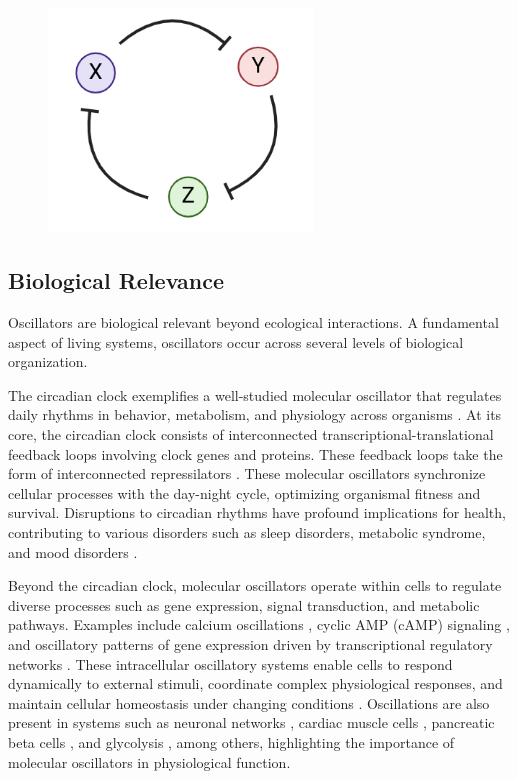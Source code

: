 \documentclass[12pt]{report}
\begin{document}
\begin{figure}
    \centering
    \includegraphics[width=7cm]{images/repressilator.png}
    \label{fig:repressilator}
\end{figure}

\subsection{Biological Relevance}
Oscillators are biological relevant beyond ecological interactions. A fundamental aspect of living systems, oscillators occur across several levels of biological organization. 

The circadian clock exemplifies a well-studied molecular oscillator that regulates daily rhythms in behavior, metabolism, and physiology across organisms \cite{circadianReview, circadianOverview}. At its core, the circadian clock consists of interconnected transcriptional-translational feedback loops involving clock genes and proteins. These feedback loops take the form of interconnected repressilators \cite{YAMASHINO2013, Pett2016}. These molecular oscillators synchronize cellular processes with the day-night cycle, optimizing organismal fitness and survival. Disruptions to circadian rhythms have profound implications for health, contributing to various disorders such as sleep disorders, metabolic syndrome, and mood disorders \cite{circadianReview}.


Beyond the circadian clock, molecular oscillators operate within cells to regulate diverse processes such as gene expression, signal transduction, and metabolic pathways. Examples include calcium oscillations \cite{Smedler2014}, cyclic AMP (cAMP) signaling \cite{Dyachok2006}, and oscillatory patterns of gene expression driven by transcriptional regulatory networks \cite{Cerone2012}. These intracellular oscillatory systems enable cells to respond dynamically to external stimuli, coordinate complex physiological responses, and maintain cellular homeostasis under changing conditions \cite{Cheong2010, Jolma2010}. Oscillations are also present in systems such as neuronal networks \cite{Cebolla2019}, cardiac muscle cells \cite{Weiss2010, Montano2001}, pancreatic beta cells \cite{Watts2014}, and glycolysis \cite{Ghosh1964}, among others, highlighting the importance of molecular oscillators in physiological function.
\end{document}

